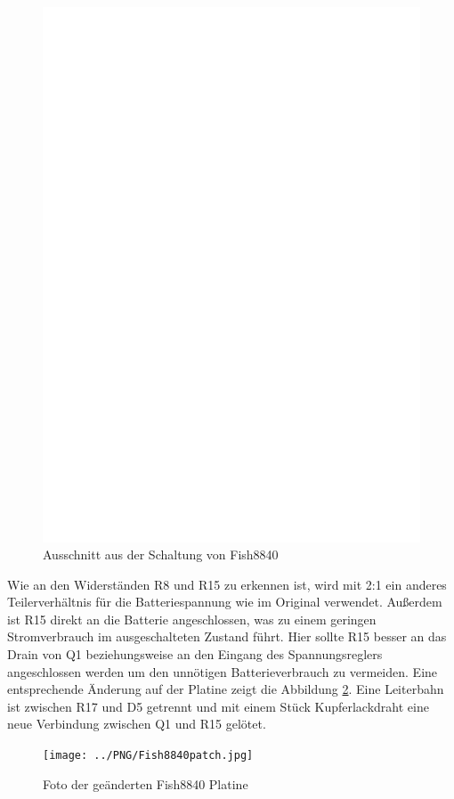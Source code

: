 \begin{figure}[H]
\centering
\includegraphics[width=12cm]{../FIG/Fish8840.eps}
\caption{Ausschnitt aus der Schaltung von Fish8840}
\label{fig:Fish8840}
\end{figure}

Wie an den Widerständen R8 und R15 zu erkennen ist, 
wird mit 2:1 ein anderes Teilerverhältnis für die Batteriespannung wie im Original verwendet.
Außerdem ist R15 direkt an die Batterie angeschlossen, was zu einem geringen Stromverbrauch im
ausgeschalteten Zustand führt. Hier sollte R15 besser an das Drain von Q1 beziehungsweise an den
Eingang des Spannungsreglers angeschlossen werden um den unnötigen Batterieverbrauch zu vermeiden.
Eine entsprechende Änderung auf der Platine zeigt die Abbildung \ref{fig:Fish8840patch}.
Eine Leiterbahn ist zwischen R17 und D5 getrennt und mit einem Stück Kupferlackdraht eine
neue Verbindung zwischen Q1 und R15 gelötet.

\begin{figure}[H]
\centering
\texttt{[image: ../PNG/Fish8840patch.jpg]}
\caption{Foto der geänderten Fish8840 Platine}
\label{fig:Fish8840patch}
\end{figure}

